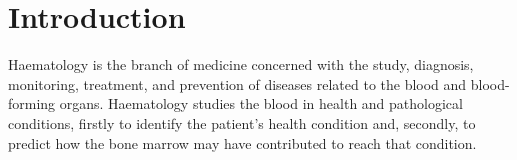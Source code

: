 \documentclass[sensors,review,submit,moreauthors,pdftex,10pt,a4paper]{mdpi}
\begin{document}


\section{Introduction}

Haematology is the branch of medicine concerned with the study, diagnosis, monitoring, treatment, and prevention of diseases related to the blood and blood-forming organs. Haematology studies the blood in health and pathological conditions, firstly to identify the patient's health condition and, secondly, to predict how the bone marrow may have contributed to reach that condition.
\end{document}
